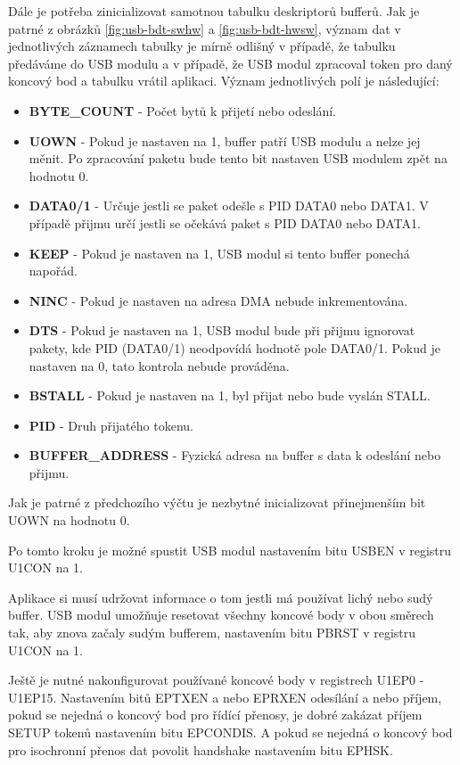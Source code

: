 Dále je potřeba zinicializovat samotnou tabulku deskriptorů bufferů. Jak je patrné z obrázků \ref{fig:usb-bdt-swhw} a \ref{fig:usb-bdt-hwsw}, význam dat v jednotlivých záznamech tabulky je mírně odlišný v případě, že tabulku předáváme do USB modulu a v případě, že USB modul zpracoval token pro daný koncový bod a tabulku vrátil aplikaci. Význam jednotlivých polí je následující:
\begin{itemize}
\item \textbf{BYTE\_COUNT} - Počet bytů k přijetí nebo odeslání.
\item \textbf{UOWN} - Pokud je nastaven na 1, buffer patří USB modulu a nelze jej měnit. Po zpracování paketu bude tento bit nastaven USB modulem zpět na hodnotu 0.
\item \textbf{DATA0/1} - Určuje jestli se paket odešle s PID DATA0 nebo DATA1. V případě přijmu určí jestli se očekává paket s PID DATA0 nebo DATA1.
\item \textbf{KEEP} - Pokud je nastaven na 1, USB modul si tento buffer ponechá napořád.
\item \textbf{NINC} - Pokud je nastaven na adresa DMA nebude inkrementována.
\item \textbf{DTS} - Pokud je nastaven na 1, USB modul bude při přijmu ignorovat pakety, kde PID (DATA0/1) neodpovídá hodnotě pole DATA0/1. Pokud je nastaven na 0, tato kontrola nebude prováděna.
\item \textbf{BSTALL} - Pokud je nastaven na 1, byl přijat nebo bude vyslán STALL. 
\item \textbf{PID} - Druh přijatého tokenu.
\item \textbf{BUFFER\_ADDRESS} - Fyzická adresa na buffer s data k odeslání nebo přijmu.
\end{itemize}

Jak je patrné z předchozího výčtu je nezbytné inicializovat přinejmenším bit UOWN na hodnotu 0. 

Po tomto kroku je možné spustit USB modul nastavením bitu USBEN v registru U1CON na 1.

Aplikace si musí udržovat informace o tom jestli má používat lichý nebo sudý buffer. USB modul umožňuje resetovat všechny koncové body v obou směrech tak, aby znova začaly sudým bufferem, nastavením bitu PBRST v registru U1CON na 1.

Ještě je nutné nakonfigurovat používané koncové body v registrech U1EP0 - U1EP15. Nastavením bitů EPTXEN a nebo EPRXEN odesílání a nebo příjem, pokud se nejedná o koncový bod pro řídící přenosy, je dobré zakázat příjem SETUP tokenů nastavením bitu EPCONDIS. A pokud se nejedná o koncový bod pro isochronní přenos dat povolit handshake nastavením bitu EPHSK. %

